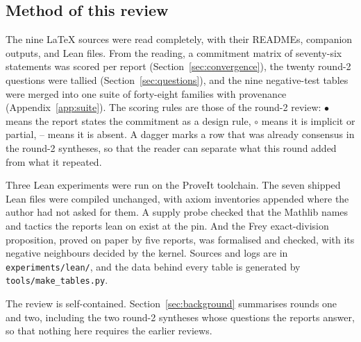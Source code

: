\documentclass[11pt,a4paper]{article}
\newcommand{\code}[1]{\nolinkurl{#1}}
\newcommand{\Yy}{$\bullet$}
\newcommand{\Pp}{$\circ$}
\newcommand{\Nn}{--}
\theoremstyle{definition}
\begin{document}
\subsection{Method of this review}
The nine \LaTeX{} sources were read completely, with their READMEs, companion outputs, and Lean files. From the reading, a commitment matrix of seventy-six statements was scored per report (Section~\ref{sec:convergence}), the twenty round-2 questions were tallied (Section~\ref{sec:questions}), and the nine negative-test tables were merged into one suite of forty-eight families with provenance (Appendix~\ref{app:suite}). The scoring rules are those of the round-2 review: \Yy{} means the report states the commitment as a design rule, \Pp{} means it is implicit or partial, \Nn{} means it is absent. A dagger marks a row that was already consensus in the round-2 syntheses, so that the reader can separate what this round added from what it repeated.

Three Lean experiments were run on the ProveIt toolchain. The seven shipped Lean files were compiled unchanged, with axiom inventories appended where the author had not asked for them. A supply probe checked that the Mathlib names and tactics the reports lean on exist at the pin. And the Frey exact-division proposition, proved on paper by five reports, was formalised and checked, with its negative neighbours decided by the kernel. Sources and logs are in \code{experiments/lean/}, and the data behind every table is generated by \code{tools/make_tables.py}.

The review is self-contained. Section~\ref{sec:background} summarises rounds one and two, including the two round-2 syntheses whose questions the reports answer, so that nothing here requires the earlier reviews.
\end{document}
